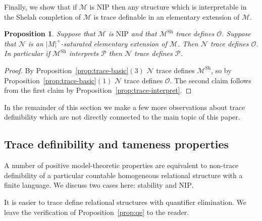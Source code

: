 \documentclass[bibalpha]{amsart}
\newtheorem{prop}[theorem]{Proposition}
\newtheorem{cor}[theorem]{Corollary}
\theoremstyle{definition}
\theoremstyle{remark}
\newcommand{\Sh}[1]{\ensuremath{\mathscr{#1}^{\mathrm{Sh}}}}
\newcommand{\nip}{\mathrm{NIP}}
\newcommand{\Sa}[1]{\ensuremath{\mathscr{#1}}}
\begin{document}


\noindent
Finally, we show that if $\Sa M$ is $\nip$ then any structure which is interpretable in the Shelah completion of $\Sa M$ is trace definable in an elementary extension of $\Sa M$.

\begin{prop}
\label{prop:trace-final}
Suppose that $\Sa M$ is $\nip$ and that $\Sh M$ trace defines $\Sa O$.
Suppose that $\Sa N$ is an $|M|^+$-saturated elementary extension of $\Sa M$.
Then $\Sa N$ trace defines $\Sa O$.
In particular if $\Sh M$ interprets $\Sa P$ then $\Sa N$ trace defines $\Sa P$.
\end{prop}

\begin{proof}
By Proposition~\ref{prop:trace-basic}$(3)$ $\Sa N$ trace defines $\Sh M$, so by Proposition~\ref{prop:trace-basic}$(1)$ $\Sa N$ trace defines $\Sa O$.
The second claim follows from the first claim by Proposition~\ref{prop:trace-interpret}.
\end{proof}

\noindent
In the remainder of this section we make a few more observations about trace definibility which are not directly connected to the main topic of this paper.

\subsection{Trace definibility and tameness properties}
A number of positive model-theoretic properties are equivalent to non-trace definibility of a particular countable homogeneous relational structure with a finite language.
We discuss two cases here: stability and $\nip$.
\newline

\noindent
It is easier to trace define relational structures with quantifier elimination.
We leave the verification of Proposition~\ref{prop:qe} to the reader.
\end{document}
